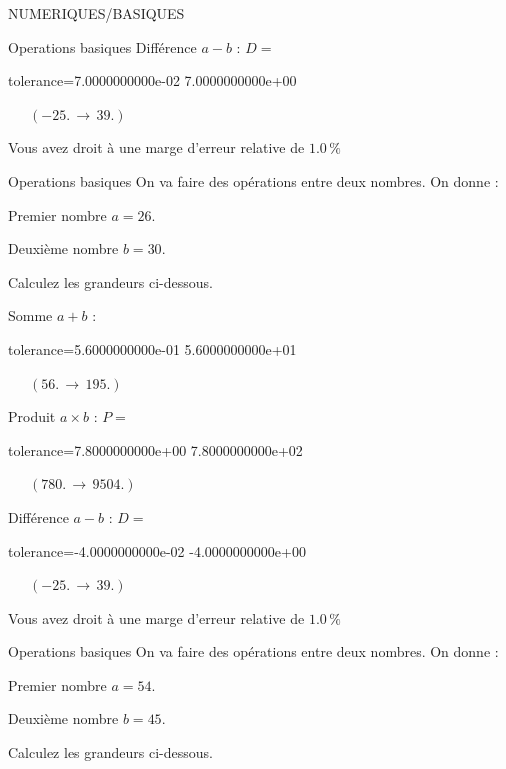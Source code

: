 \documentclass[12pt]{article}
\begin{document}
\begin{quiz}{NUMERIQUES/BASIQUES}
\begin{cloze}{Operations basiques}
Différence $ a - b $ : $D =  $
\begin{numerical}[points=1] 
\item[tolerance={7.0000000000e-02}] 7.0000000000e+00 
\end{numerical} 
 $\,$ 
 $ \quad (-25. \, \rightarrow \, 39.) $ 

Vous avez droit à une marge d'erreur relative de $1.0\, \% $

\end{cloze} 


 \begin{cloze}{Operations basiques} 
On va faire des opérations entre deux nombres. On donne :

Premier nombre $a = 26.\, $

Deuxième nombre $b = 30.\, $

 

Calculez les grandeurs ci-dessous.

Somme $ a + b $ : 
\begin{numerical}[points=1] 
\item[tolerance={5.6000000000e-01}] 5.6000000000e+01 
\end{numerical} 
 $\,$ 
 $ \quad (56. \, \rightarrow \, 195.) $ 

Produit $ a \times b $ : $P =  $
\begin{numerical}[points=1] 
\item[tolerance={7.8000000000e+00}] 7.8000000000e+02 
\end{numerical} 
 $\,$ 
 $ \quad (780. \, \rightarrow \, 9504.) $ 

Différence $ a - b $ : $D =  $
\begin{numerical}[points=1] 
\item[tolerance={-4.0000000000e-02}] -4.0000000000e+00 
\end{numerical} 
 $\,$ 
 $ \quad (-25. \, \rightarrow \, 39.) $ 

Vous avez droit à une marge d'erreur relative de $1.0\, \% $

\end{cloze} 


 \begin{cloze}{Operations basiques} 
On va faire des opérations entre deux nombres. On donne :

Premier nombre $a = 54.\, $

Deuxième nombre $b = 45.\, $

 

Calculez les grandeurs ci-dessous.


\end{cloze}
\end{quiz}
\end{document}

